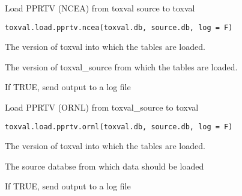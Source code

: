 \documentclass[letterpaper]{book}
\begin{document}
%
\begin{Description}\relax
Load PPRTV (NCEA) from toxval source to toxval
\end{Description}
%
\begin{Usage}
\begin{verbatim}
toxval.load.pprtv.ncea(toxval.db, source.db, log = F)
\end{verbatim}
\end{Usage}
%
\begin{Arguments}
\begin{ldescription}
\item[\code{toxval.db}] The version of toxval into which the tables are loaded.

\item[\code{source.db}] The version of toxval\_source from which the tables are loaded.

\item[\code{log}] If TRUE, send output to a log file
\end{ldescription}
\end{Arguments}
%
\begin{Description}\relax
Load PPRTV (ORNL) from toxval\_source to toxval
\end{Description}
%
\begin{Usage}
\begin{verbatim}
toxval.load.pprtv.ornl(toxval.db, source.db, log = F)
\end{verbatim}
\end{Usage}
%
\begin{Arguments}
\begin{ldescription}
\item[\code{toxval.db}] The version of toxval into which the tables are loaded.

\item[\code{source.db}] The source databse from which data should be loaded

\item[\code{log}] If TRUE, send output to a log file
\end{ldescription}
\end{Arguments}
\end{document}
